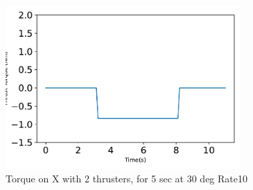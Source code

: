 \begin{figure}[htbp]\centerline{\includegraphics[width=0.8\textwidth]{AutoTeX/Torque_2Thrusters_5s_30deg_Loc2_Rate10}}\caption{Torque on X with 2 thrusters, for 5 sec at 30 deg Rate10}\label{fig:Torque_2Thrusters_5s_30deg_Loc2_Rate10}\end{figure}